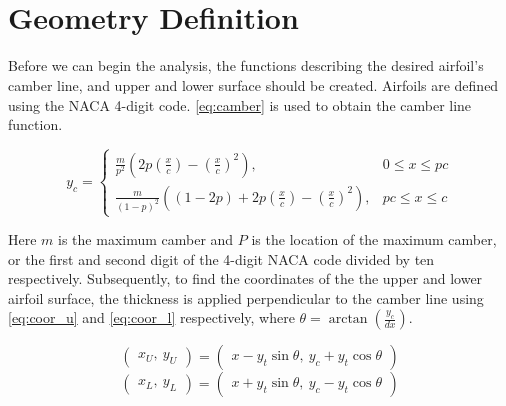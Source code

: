 \blindtext\\

\blindtext\\

\section{Geometry Definition}
Before we can begin the analysis, the functions describing the desired airfoil's
camber line, and upper and lower surface should be created. Airfoils are defined
using the NACA 4-digit code. \autoref{eq:camber} is used to obtain the camber
line function.

\begin{equation}
\label{eq:camber}
    y_{c}=\left\{
        \begin{array}{ll}
            \frac{m}{p^{2}}\left(2 p\left(\frac{x}{c}\right)-\left(\frac{x}{c}\right)^{2}\right),
            & 0 \leq x \leq p c \\
            \frac{m}{(1-p)^{2}}\left((1-2 p)+2 p\left(\frac{x}{c}\right)-\left(\frac{x}{c}\right)^{2}\right),
            & p c \leq x \leq c
        \end{array}\right.
\end{equation}
\medskip

Here $m$ is the maximum camber and $P$ is the location of the maximum camber, or
the first and second digit of the 4-digit NACA code divided by ten respectively.
Subsequently, to find the coordinates of the the upper and lower airfoil
surface, the thickness is applied perpendicular to the camber line using
\autoref{eq:coor_u} and \autoref{eq:coor_l} respectively, where $\theta =
\arctan\left( \frac{y_c}{dx}\right)$.

\begin{equation}
\label{eq:coor_u}
    \left(\begin{array}{l} x_U, \: y_U\end{array}\right) =
    \left(\begin{array}{l} x-y_t \sin \theta, \: y_c+y_t\cos \theta\end{array}\right)
\end{equation}
\begin{equation}
\label{eq:coor_l}
    \left(\begin{array}{l} x_L, \:  y_L\end{array}\right) =
    \left(\begin{array}{l} x+y_t \sin \theta, \: y_c-y_ t \cos \theta\end{array}\right)
\end{equation}

